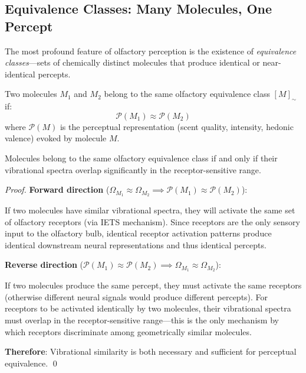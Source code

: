 \subsection{Equivalence Classes: Many Molecules, One Percept}

The most profound feature of olfactory perception is the existence of \textit{equivalence classes}—sets of chemically distinct molecules that produce identical or near-identical percepts.

\begin{definition}
\label{def:olfactory_equivalence}
Two molecules $M_1$ and $M_2$ belong to the same olfactory equivalence class $[M]_{\sim}$ if:
\begin{equation}
\mathcal{P}(M_1) \approx \mathcal{P}(M_2)
\end{equation}
where $\mathcal{P}(M)$ is the perceptual representation (scent quality, intensity, hedonic valence) evoked by molecule $M$.
\end{definition}

\begin{theorem}
\label{thm:vibrational_equivalence}
Molecules belong to the same olfactory equivalence class if and only if their vibrational spectra overlap significantly in the receptor-sensitive range.
\end{theorem}

\begin{proof}
\textbf{Forward direction} ($\Omega_{M_1} \approx \Omega_{M_2} \implies \mathcal{P}(M_1) \approx \mathcal{P}(M_2)$):

If two molecules have similar vibrational spectra, they will activate the same set of olfactory receptors (via IETS mechanism). Since receptors are the only sensory input to the olfactory bulb, identical receptor activation patterns produce identical downstream neural representations and thus identical percepts.

\textbf{Reverse direction} ($\mathcal{P}(M_1) \approx \mathcal{P}(M_2) \implies \Omega_{M_1} \approx \Omega_{M_2}$):

If two molecules produce the same percept, they must activate the same receptors (otherwise different neural signals would produce different percepts). For receptors to be activated identically by two molecules, their vibrational spectra must overlap in the receptor-sensitive range—this is the only mechanism by which receptors discriminate among geometrically similar molecules.

\textbf{Therefore}: Vibrational similarity is both necessary and sufficient for perceptual equivalence. \qed
\end{proof}

